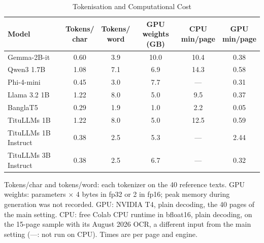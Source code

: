 \begin{table}[t]
\centering
\caption{Tokenisation and Computational Cost}
\label{tab:cost}
\setlength{\tabcolsep}{2pt}
\footnotesize
\begin{tabular}{lccccc}
\toprule
Model & \shortstack{Tokens/\\char} & \shortstack{Tokens/\\word} & \shortstack{GPU weights\\(GB)} & \shortstack{CPU\\min/page} & \shortstack{GPU\\min/page} \\
\midrule
Gemma-2B-it & 0.60 & 3.9 & 10.0 & 10.4 & 0.38 \\
Qwen3 1.7B & 1.08 & 7.1 & 6.9 & 14.3 & 0.58 \\
Phi-4-mini & 0.45 & 3.0 & 7.7 & --- & 0.31 \\
Llama 3.2 1B & 1.22 & 8.0 & 5.0 & 9.5 & 0.37 \\
BanglaT5 & 0.29 & 1.9 & 1.0 & 2.2 & 0.05 \\
TituLLMs 1B & 1.22 & 8.0 & 5.0 & 12.5 & 0.59 \\
TituLLMs 1B Instruct & 0.38 & 2.5 & 5.3 & --- & 2.44 \\
TituLLMs 3B Instruct & 0.38 & 2.5 & 6.7 & --- & 0.32 \\
\bottomrule
\end{tabular}
\par\smallskip
\begin{minipage}{\linewidth}\footnotesize Tokens/char and tokens/word: each tokenizer on the 40 reference texts. GPU weights: parameters $\times$ 4 bytes in fp32 or 2 in fp16; peak memory during generation was not recorded. GPU: NVIDIA T4, plain decoding, the 40 pages of the main setting. CPU: free Colab CPU runtime in bfloat16, plain decoding, on the 15-page sample with its August 2026 OCR, a different input from the main setting (---: not run on CPU). Times are per page and engine.\end{minipage}
\end{table}
